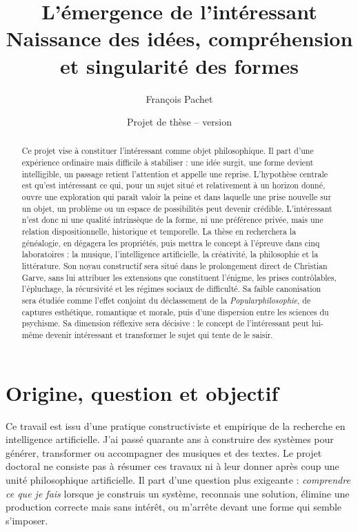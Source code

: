 \documentclass[11pt,a4paper]{article}
\title{L'émergence de l'intéressant\\
\large Naissance des idées, compréhension et singularité des formes}
\author{François Pachet}
\date{Projet de thèse -- version \projectversion\\\small \projectdate}
\begin{document}
\maketitle

\begin{abstract}
Ce projet vise à constituer l'intéressant comme objet philosophique. Il part
d'une expérience ordinaire mais difficile à stabiliser : une idée surgit, une
forme devient intelligible, un passage retient l'attention et appelle une
reprise. L'hypothèse centrale est qu'est intéressant ce qui, pour un sujet situé
et relativement à un horizon donné, ouvre une exploration qui paraît valoir la
peine et dans laquelle une prise nouvelle sur un objet, un problème ou un espace
de possibilités peut devenir crédible. L'intéressant n'est donc ni une qualité intrinsèque de la forme,
ni une préférence privée, mais une relation dispositionnelle, historique et
temporelle. La thèse en recherchera la généalogie, en dégagera les propriétés,
puis mettra le concept à l'épreuve dans cinq laboratoires : la musique,
l'intelligence artificielle, la créativité, la philosophie et la littérature.
Son noyau constructif sera situé dans le prolongement direct de Christian
Garve, sans lui attribuer les extensions que constituent l'énigme, les prises
contrôlables, l'épluchage, la récursivité et les régimes sociaux de difficulté.
Sa faible canonisation sera étudiée comme l'effet conjoint du déclassement de la
\emph{Popularphilosophie}, de captures esthétique, romantique et morale, puis
d'une dispersion entre les sciences du psychisme.
Sa dimension réflexive sera décisive : le concept de l'intéressant peut
lui-même devenir intéressant et transformer le sujet qui tente de le saisir.
\end{abstract}

\section{Origine, question et objectif}

Ce travail est issu d'une pratique constructiviste et empirique de la recherche
en intelligence artificielle. J'ai passé quarante ans à construire des systèmes
pour générer, transformer ou accompagner des musiques et des textes. Le projet
doctoral ne consiste pas à résumer ces travaux ni à leur donner après coup une
unité philosophique artificielle. Il part d'une question plus exigeante :
\emph{comprendre ce que je fais} lorsque je construis un système, reconnais une
solution, élimine une production correcte mais sans intérêt, ou m'arrête devant
une forme qui semble s'imposer.
\end{document}
